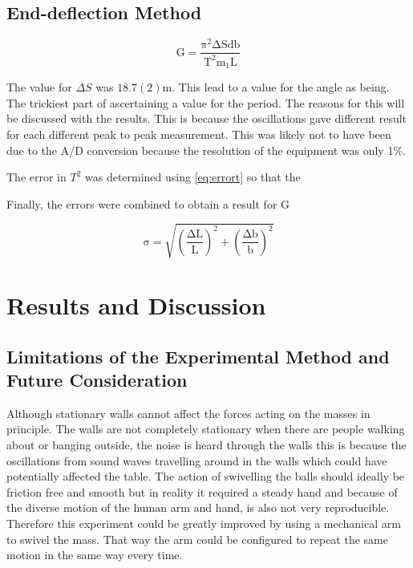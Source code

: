 \documentclass[12pt]{article}
\begin{document}
\subsection{End-deflection Method}


\begin{equation}
\label{eq:gdef}
\mathrm{G=\frac{\pi^{2}\Delta{S} d b }{T^{2}m_{1}L}}
\end{equation}


The value for $\Delta{S}$ was $18.7(2)\mathrm{m}$. This lead to a value for the angle as being. The trickiest part of ascertaining a value for the period. The reasons for this will be discussed with the results.  This is because the oscillations gave different result for each different peak to peak measurement. This was likely not to have been due to the A/D conversion because the resolution of the equipment was only 1\%.

The error in $T^{2}$ was determined using \cref{eq:errort} so that the 

Finally, the errors were combined to obtain a result for G 

\begin{equation}
\label{eq:errors}
\mathrm{\sigma=\sqrt{\left(\frac{\Delta L }{L}\right)^{2}+\left(\frac{\Delta b}{b}\right)^{2}}}
\end{equation}

\section{Results and Discussion}

\subsection{Limitations of the Experimental Method and Future Consideration}

Although stationary walls cannot affect the forces acting on the masses in principle. The walls are not completely stationary when there are people walking about or banging outside, the noise is heard through the walls this is because the oscillations from sound waves travelling around in the walls which could have potentially affected the table. The action of swivelling the balls should ideally be friction free and smooth but in reality it required a steady hand and because of the diverse motion of the human arm and hand, is also not very reproducible. Therefore this experiment could be greatly improved by using a mechanical arm to swivel the mass. That way the arm could be configured to repeat the same motion in the same way every time. 
\end{document}
